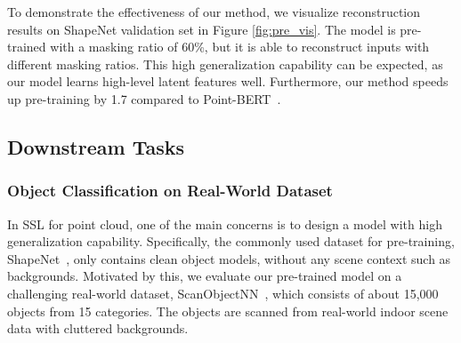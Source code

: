 \documentclass[runningheads]{llncs}
\begin{document}
To demonstrate the effectiveness of our method, we visualize reconstruction results on ShapeNet validation set in Figure \ref{fig:pre_vis}. The model is pre-trained with a masking ratio of 60\%, but it is able to reconstruct inputs with different masking ratios. This high generalization capability can be expected, as our model learns high-level latent features well. Furthermore, our method speeds up pre-training by 1.7 compared to Point-BERT~\cite{pointbert}.


\subsection{Downstream Tasks}

\subsubsection{Object Classification on Real-World Dataset}

In SSL for point cloud, one of the main concerns is to design a model with high generalization capability. Specifically, the commonly used dataset for pre-training, ShapeNet~\cite{shapenet}, only contains clean object models, without any scene context such as backgrounds. Motivated by this, we evaluate our pre-trained model on a challenging real-world dataset, ScanObjectNN~\cite{scan}, which consists of about 15,000 objects from 15 categories. The objects are scanned from real-world indoor scene data with cluttered backgrounds.
\end{document}

